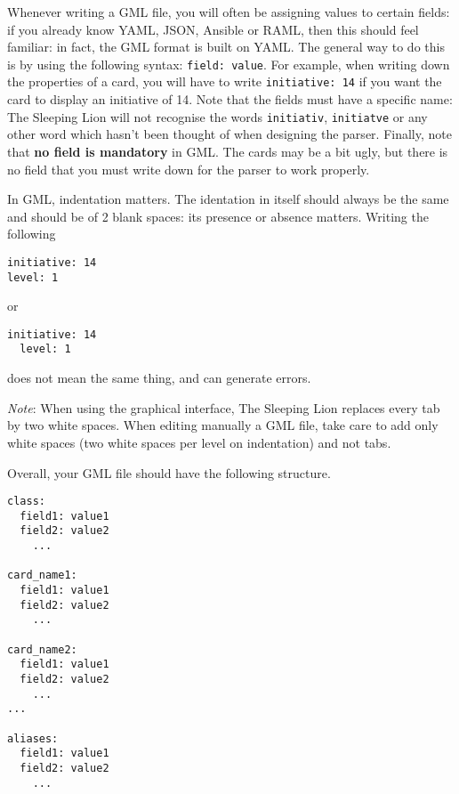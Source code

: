 \documentclass{article}
\begin{document}
Whenever writing a GML file, you will often be assigning values to certain fields: if you already know YAML, JSON, Ansible or RAML, then this should feel familiar: in fact, the GML format is built on YAML. The general way to do this is by using the following syntax: \verb`field: value`.
For example, when writing down the properties of a card, you will have to write \verb`initiative: 14` if you want the card to display an initiative of 14. Note that the fields must have a specific name: The Sleeping Lion will not recognise the words \verb`initiativ`, \verb`initiatve` or any other word which hasn't been thought of when designing the parser. Finally, note that \textbf{no field is mandatory} in GML. The cards may be a bit ugly, but there is no field that you must write down for the parser to work properly.

In GML, indentation matters.  The identation in itself should always be the same and should be of 2 blank spaces: its presence or absence matters. Writing the following
\begin{center}
\begin{BVerbatim}
initiative: 14
level: 1
\end{BVerbatim}
\end{center}

or

\begin{center}
\begin{BVerbatim}
initiative: 14
  level: 1
\end{BVerbatim}
\end{center}
does not mean the same thing, and can generate errors.

\textit{Note}: When using the graphical interface, The Sleeping Lion replaces every tab by two white spaces. When editing manually a GML file, take care to add only white spaces (two white spaces per level on indentation) and not tabs.

Overall, your GML file should have the following structure.
\begin{center}
\begin{BVerbatim}
class:
  field1: value1
  field2: value2
    ...

card_name1:
  field1: value1
  field2: value2
    ...

card_name2:
  field1: value1
  field2: value2
    ...
...

aliases:
  field1: value1
  field2: value2
    ...
\end{BVerbatim}
\end{center}
\end{document}
